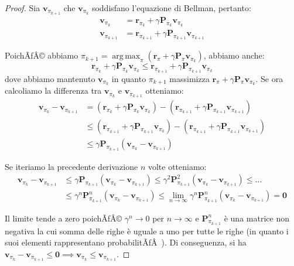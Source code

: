 ﻿\documentclass[11pt, a4paper]{report}
\DeclareMathOperator*{\argmax}{arg\,max}
\begin{document}
\begin{proof}
Sia $\bm{v}_{\pi_{k+1}}$ che $\bm{v}_{\pi_k}$ soddisfano l'equazione di Bellman, pertanto:
\begin{align}
\bm{v}_{\pi_k} &= \bm{r}_{\pi_k} + \gamma \bm{P}_{\pi_k} \bm{v}_{\pi_k} \nonumber \\
\bm{v}_{\pi_{k+1}} &= \bm{r}_{\pi_{k+1}} + \gamma \bm{P}_{\pi_{k+1}} \bm{v}_{\pi_{k+1}}
\end{align}

PoichÃƒÂ© abbiamo $\pi_{k+1} = \argmax_\pi (\bm{r}_\pi + \gamma \bm{P}_\pi \bm{v}_{\pi_k})$, abbiamo anche:
\begin{equation}
\bm{r}_{\pi_k} + \gamma \bm{P}_{\pi_k} \bm{v}_{\pi_k} \le \bm{r}_{\pi_{k+1}} + \gamma \bm{P}_{\pi_{k+1}} \bm{v}_{\pi_k}
\end{equation}
dove abbiamo mantenuto $\bm{v}_{\pi_k}$ in quanto $\pi_{k+1}$ massimizza $\bm{r}_\pi + \gamma \bm{P}_\pi \bm{v}_{\pi_k}$. Se ora calcoliamo la differenza tra $\bm{v}_{\pi_k}$ e $\bm{v}_{\pi_{k+1}}$ otteniamo:
\begin{align}
\bm{v}_{\pi_k} - \bm{v}_{\pi_{k+1}} &= (\bm{r}_{\pi_k} + \gamma \bm{P}_{\pi_k} \bm{v}_{\pi_k}) - (\bm{r}_{\pi_{k+1}} + \gamma \bm{P}_{\pi_{k+1}} \bm{v}_{\pi_{k+1}}) \nonumber \\
&\le (\bm{r}_{\pi_{k+1}} + \gamma \bm{P}_{\pi_{k+1}} \bm{v}_{\pi_k}) - (\bm{r}_{\pi_{k+1}} + \gamma \bm{P}_{\pi_{k+1}} \bm{v}_{\pi_{k+1}}) \nonumber \\
&\le \gamma \bm{P}_{\pi_{k+1}} (\bm{v}_{\pi_k} - \bm{v}_{\pi_{k+1}})
\end{align}

Se iteriamo la precedente derivazione $n$ volte otteniamo:
\begin{align}
\bm{v}_{\pi_k} - \bm{v}_{\pi_{k+1}} &\le \gamma \bm{P}_{\pi_{k+1}} (\bm{v}_{\pi_k} - \bm{v}_{\pi_{k+1}}) \le \gamma^2 \bm{P}_{\pi_{k+1}}^2 (\bm{v}_{\pi_k} - \bm{v}_{\pi_{k+1}}) \le \dots \nonumber \\
&\le \gamma^n \bm{P}_{\pi_{k+1}}^n (\bm{v}_{\pi_k} - \bm{v}_{\pi_{k+1}}) \le \lim_{n \to \infty} \gamma^n \bm{P}_{\pi_{k+1}}^n (\bm{v}_{\pi_k} - \bm{v}_{\pi_{k+1}}) = \bm{0}
\end{align}

Il limite tende a zero poichÃƒÂ© $\gamma^n \to 0$ per $n \to \infty$ e $\bm{P}_{\pi_{k+1}}^n$ è una matrice non negativa la cui somma delle righe è uguale a uno per tutte le righe (in quanto i suoi elementi rappresentano probabilitÃƒÂ ). Di conseguenza, si ha $\bm{v}_{\pi_k} - \bm{v}_{\pi_{k+1}} \le \bm{0} \implies \bm{v}_{\pi_k} \le \bm{v}_{\pi_{k+1}}$.
\end{proof}
\end{document}
